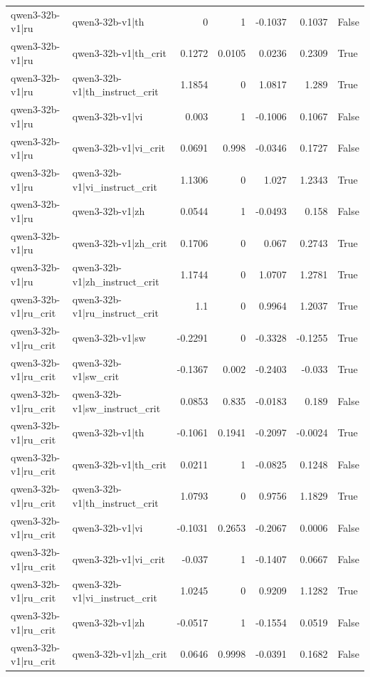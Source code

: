 \begin{table}
\begin{tabular}{l l r r r r l}
qwen3-32b-v1|ru & qwen3-32b-v1|th & 0 & 1 & -0.1037 & 0.1037 & False \\
qwen3-32b-v1|ru & qwen3-32b-v1|th_crit & 0.1272 & 0.0105 & 0.0236 & 0.2309 & True \\
qwen3-32b-v1|ru & qwen3-32b-v1|th_instruct_crit & 1.1854 & 0 & 1.0817 & 1.289 & True \\
qwen3-32b-v1|ru & qwen3-32b-v1|vi & 0.003 & 1 & -0.1006 & 0.1067 & False \\
qwen3-32b-v1|ru & qwen3-32b-v1|vi_crit & 0.0691 & 0.998 & -0.0346 & 0.1727 & False \\
qwen3-32b-v1|ru & qwen3-32b-v1|vi_instruct_crit & 1.1306 & 0 & 1.027 & 1.2343 & True \\
qwen3-32b-v1|ru & qwen3-32b-v1|zh & 0.0544 & 1 & -0.0493 & 0.158 & False \\
qwen3-32b-v1|ru & qwen3-32b-v1|zh_crit & 0.1706 & 0 & 0.067 & 0.2743 & True \\
qwen3-32b-v1|ru & qwen3-32b-v1|zh_instruct_crit & 1.1744 & 0 & 1.0707 & 1.2781 & True \\
qwen3-32b-v1|ru_crit & qwen3-32b-v1|ru_instruct_crit & 1.1 & 0 & 0.9964 & 1.2037 & True \\
qwen3-32b-v1|ru_crit & qwen3-32b-v1|sw & -0.2291 & 0 & -0.3328 & -0.1255 & True \\
qwen3-32b-v1|ru_crit & qwen3-32b-v1|sw_crit & -0.1367 & 0.002 & -0.2403 & -0.033 & True \\
qwen3-32b-v1|ru_crit & qwen3-32b-v1|sw_instruct_crit & 0.0853 & 0.835 & -0.0183 & 0.189 & False \\
qwen3-32b-v1|ru_crit & qwen3-32b-v1|th & -0.1061 & 0.1941 & -0.2097 & -0.0024 & True \\
qwen3-32b-v1|ru_crit & qwen3-32b-v1|th_crit & 0.0211 & 1 & -0.0825 & 0.1248 & False \\
qwen3-32b-v1|ru_crit & qwen3-32b-v1|th_instruct_crit & 1.0793 & 0 & 0.9756 & 1.1829 & True \\
qwen3-32b-v1|ru_crit & qwen3-32b-v1|vi & -0.1031 & 0.2653 & -0.2067 & 0.0006 & False \\
qwen3-32b-v1|ru_crit & qwen3-32b-v1|vi_crit & -0.037 & 1 & -0.1407 & 0.0667 & False \\
qwen3-32b-v1|ru_crit & qwen3-32b-v1|vi_instruct_crit & 1.0245 & 0 & 0.9209 & 1.1282 & True \\
qwen3-32b-v1|ru_crit & qwen3-32b-v1|zh & -0.0517 & 1 & -0.1554 & 0.0519 & False \\
qwen3-32b-v1|ru_crit & qwen3-32b-v1|zh_crit & 0.0646 & 0.9998 & -0.0391 & 0.1682 & False \\

\end{tabular}
\end{table}
